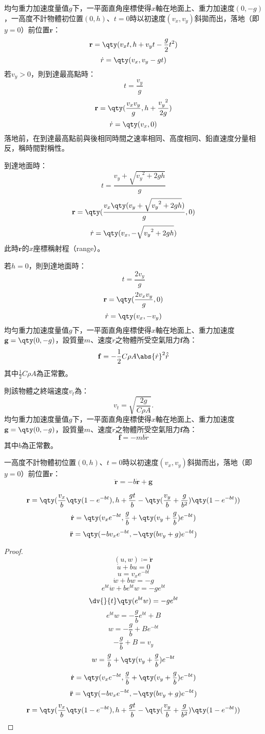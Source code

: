 \documentclass[a4paper,12pt]{article}
\begin{document}
均勻重力加速度量值$g$下，一平面直角座標使得$x$軸在地面上、重力加速度$(0,-g)$，一高度不計物體初位置$(0,h)$、$t=0$時以初速度$(v_x,v_y)$斜拋而出，落地（即$y=0$）前位置$\mathbf{r}$：
\[\mathbf{r}=\qty(v_xt,h+v_yt-\frac{g}{2}t^2)\]
\[\dot{r}=\qty(v_x,v_y-gt)\]
若$v_y>0$，則到達最高點時：
\[t=\frac{v_y}{g}\]
\[\mathbf{r}=\qty(\frac{v_xv_y}{g},h+\frac{v_y^{\phantom{y}2}}{2g})\]
\[\dot{r}=\qty(v_x,0)\]
落地前，在到達最高點前與後相同時間之速率相同、高度相同、鉛直速度分量相反，稱時間對稱性。

到達地面時：
\[t=\frac{v_y+\sqrt{v_y^{\phantom{y}2}+2gh}}{g}\]
\[\mathbf{r}=\qty(\frac{v_x\qty(v_y+\sqrt{v_y^{\phantom{y}2}+2gh})}{g},0)\]
\[\dot{r}=\qty(v_x,-\sqrt{v_y^{\phantom{y}2}+2gh})\]
此時$\mathbf{r}$的$x$座標稱射程（range）。

若$h=0$，則到達地面時：
\[t=\frac{2v_y}{g}\]
\[\mathbf{r}=\qty(\frac{2v_xv_y}{g},0)\]
\[\dot{r}=\qty(v_x,-v_y)\]
均勻重力加速度量值$g$下，一平面直角座標使得$x$軸在地面上、重力加速度$\mathbf{g}=\qty(0,-g)$，設質量$m$、速度$\dot{r}$之物體所受空氣阻力$\mathbf{f}$為：
\[\mathbf{f}=-\frac{1}{2}C\rho A\abs{\dot{r}}^2\hat{\dot{r}}\]
其中$\frac{1}{2}C\rho A$為正常數。

則該物體之終端速度$v_t$為：
\[v_t=\sqrt{\frac{2g}{C\rho A}}.\]
均勻重力加速度量值$g$下，一平面直角座標使得$x$軸在地面上、重力加速度$\mathbf{g}=\qty(0,-g)$，設質量$m$、速度$\dot{r}$之物體所受空氣阻力$\mathbf{f}$為：
\[\mathbf{f}=-mb\dot{r}\]
其中$b$為正常數。

一高度不計物體初位置$(0,h)$、$t=0$時以初速度$(v_x,v_y)$斜拋而出，落地（即$y=0$）前位置$\mathbf{r}$：
\[\ddot{\mathbf{r}}=-b\dot{\mathbf{r}}+\mathbf{g}\]

\[\mathbf{r}=\qty(\frac{v_x}{b}\qty(1-e^{-bt}),h+\frac{gt}{b}-\qty(\frac{v_y}{b}+\frac{g}{b^2})\qty(1-e^{-bt}))\]
\[\dot{\mathbf{r}}=\qty(v_xe^{-bt},\frac{g}{b}+\qty(v_y+\frac{g}{b})e^{-bt})\]
\[\ddot{\mathbf{r}}=\qty(-bv_xe^{-bt},-\qty(bv_y+g)e^{-bt})\]
\begin{proof}
\[(u,w)\coloneq\dot{\mathbf{r}}\]
\[\dot{u}+bu=0\]
\[u=v_xe^{-bt}\]
\[\dot{w}+bw=-g\]
\[e^{bt}\dot{w}+be^{bt}w=-ge^{bt}\]
\[\dv{}{t}\qty(e^{bt}w)=-ge^{bt}\]
\[e^{bt}w=-\frac{g}{b}e^{bt}+B\]
\[w=-\frac{g}{b}+Be^{-bt}\]
\[-\frac{g}{b}+B=v_y\]
\[w=\frac{g}{b}+\qty(v_y+\frac{g}{b})e^{-bt}\]
\[\dot{\mathbf{r}}=\qty(v_xe^{-bt},\frac{g}{b}+\qty(v_y+\frac{g}{b})e^{-bt})\]
\[\ddot{\mathbf{r}}=\qty(-bv_xe^{-bt},-\qty(bv_y+g)e^{-bt})\]
\[\mathbf{r}=\qty(\frac{v_x}{b}\qty(1-e^{-bt}),h+\frac{gt}{b}-\qty(\frac{v_y}{b}+\frac{g}{b^2})\qty(1-e^{-bt}))\]
\end{proof}
\end{document}
